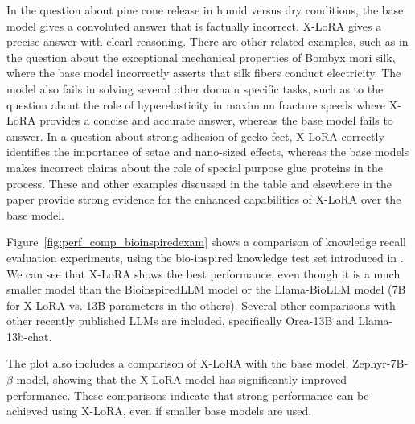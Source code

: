 In the question about pine cone release in humid versus dry conditions, the base model gives a convoluted answer that is factually incorrect. X-LoRA gives a precise answer with clearl reasoning. There are other related examples, such as in the question about the exceptional mechanical properties of Bombyx mori silk, where the base model incorrectly asserts that silk fibers conduct electricity. The model also fails in solving several other domain specific tasks, such as to the question about the role of hyperelasticity in maximum fracture speeds where X-LoRA provides a concise and accurate answer, whereas the base model fails to answer. In a question about strong adhesion of gecko feet, X-LoRA correctly identifies the importance of setae and nano-sized effects, whereas the base models makes incorrect claims about the role of special purpose glue proteins in the process. These and other examples discussed in the table and elsewhere in the paper provide strong evidence for the enhanced capabilities of X-LoRA over the base model. 




\begingroup 
\tiny 



    \label{tab:table_qa}
    
\endgroup 


Figure~\ref{fig:perf_comp_bioinspiredexam} shows a comparison of knowledge recall evaluation experiments, using the bio-inspired knowledge test set introduced in \cite{Luu2023BioinspiredLLM:Materials}. We can see that X-LoRA shows the best performance, even though it is a much smaller model than the BioinspiredLLM model or the Llama-BioLLM model (7B for X-LoRA vs. 13B parameters in the others). Several other comparisons with other recently published LLMs are included, specifically Orca-13B and Llama-13b-chat.

The plot also includes a comparison of X-LoRA with the base model,  Zephyr-7B-$\beta$ model, showing that the X-LoRA model has significantly improved performance. These comparisons indicate that strong performance can be achieved using X-LoRA, even if smaller base models are used.  




